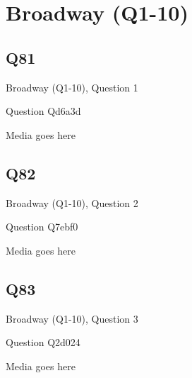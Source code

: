 \documentclass[11pt]{beamer}
\begin{document}
\section{Broadway (Q1-10)}
    

\subsection*{Q81}
\begin{frame}[t]{Broadway (Q1-10), Question 1}
\vspace{2em}
\begin{block}{Question}
Qd6a3d
\end{block}
\begin{center}
Media goes here
\end{center}
\end{frame}
    

\subsection*{Q82}
\begin{frame}[t]{Broadway (Q1-10), Question 2}
\vspace{2em}
\begin{block}{Question}
Q7ebf0
\end{block}
\begin{center}
Media goes here
\end{center}
\end{frame}
    

\subsection*{Q83}
\begin{frame}[t]{Broadway (Q1-10), Question 3}
\vspace{2em}
\begin{block}{Question}
Q2d024
\end{block}
\begin{center}
Media goes here
\end{center}
\end{frame}
    
\end{document}
